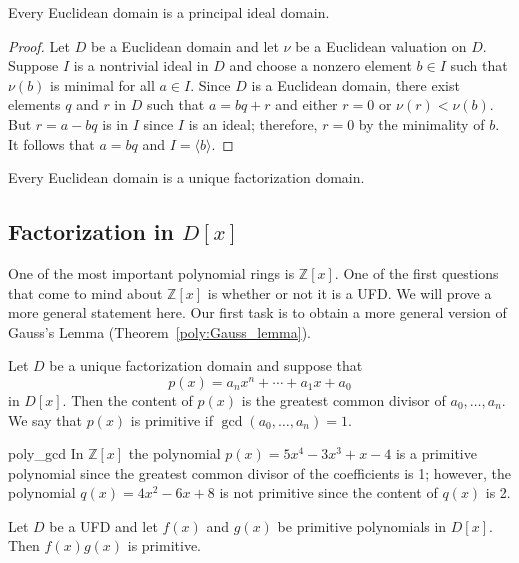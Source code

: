 \begin{theorem}
Every Euclidean domain is a principal ideal domain.
\end{theorem}
 
\begin{proof}
Let $D$ be a Euclidean domain and let $\nu$ be a Euclidean valuation
on $D$.  Suppose $I$ is a nontrivial ideal in $D$ and choose a nonzero
element $b \in I$ such that $\nu(b)$ is minimal for all $a \in I$. 
Since $D$ is a Euclidean domain, there exist elements $q$ and $r$ in
$D$ such that $a = bq +r$ and either $r=0$ or $\nu(r) < \nu(b)$. But
$r = a - bq$ is in $I$ since $I$ is an ideal; therefore, $r = 0$ by the
minimality of $b$. It follows that $a = bq$ and $I = \langle b
\rangle$. 
\end{proof}
 

\begin{corollary}
Every Euclidean domain is a unique factorization domain.
\end{corollary}


\subsection*{Factorization in $D[x]$}

One of the most important polynomial rings is ${\mathbb Z}[x]$.  One of the first questions that come to mind about ${\mathbb Z}[x]$ is whether or not it is a UFD.  We will prove a more general statement here.  Our first task is to obtain a more general version of Gauss's Lemma
(Theorem~\ref{poly:Gauss_lemma}).  

Let $D$ be a unique factorization domain and suppose that 
\[
p(x) = a_n x^n + \cdots + a_1 x + a_0
\]
in $D[x]$.  Then the {\bfi content\/} of $p(x)$ is the greatest common divisor of $a_0, \ldots, a_n$.  We say
that $p(x)$ is {\bfi primitive\/} if $\gcd(a_0, \ldots, a_n ) = 1$.    


 
\begin{example}{poly_gcd}
In ${\mathbb Z}[x]$ the polynomial $p(x)= 5 x^4 - 3 x^3 + x -4$ is a primitive polynomial since the greatest common divisor of the
coefficients is 1; however, the polynomial $q(x) = 4 x^2 - 6 x + 8$ is not primitive since the content of $q(x)$ is 2.
\end{example}
 
\begin{theorem}\label{domains:Gauss_lemma}
Let $D$ be a UFD and let $f(x)$ and $g(x)$ be primitive polynomials in $D[x]$.  Then $f(x) g(x)$ is primitive.
\end{theorem}
 
